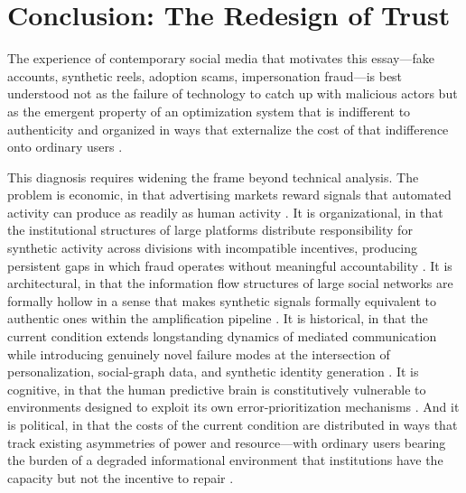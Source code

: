 \documentclass[12pt,a4paper]{article}
\begin{document}
\section{Conclusion: The Redesign of Trust}

The experience of contemporary social media that motivates this essay---fake accounts, synthetic
reels, adoption scams, impersonation fraud---is best understood not as the failure of technology
to catch up with malicious actors but as the emergent property of an optimization system that
is indifferent to authenticity and organized in ways that externalize the cost of that
indifference onto ordinary users \citep{zuboff2019,gillespie2018}.

This diagnosis requires widening the frame beyond technical analysis. The problem is economic,
in that advertising markets reward signals that automated activity can produce as readily as
human activity \citep{wu2016}. It is organizational, in that the institutional structures of
large platforms distribute responsibility for synthetic activity across divisions with incompatible
incentives, producing persistent gaps in which fraud operates without meaningful accountability
\citep{tufekci2015}. It is architectural, in that the information flow structures of large
social networks are formally hollow in a sense that makes synthetic signals formally equivalent
to authentic ones within the amplification pipeline \citep{gloy2025}. It is historical, in that
the current condition extends longstanding dynamics of mediated communication while introducing
genuinely novel failure modes at the intersection of personalization, social-graph data, and
synthetic identity generation \citep{debord1967,postman1985,vosoughi2018}. It is cognitive, in
that the human predictive brain is constitutively vulnerable to environments designed to exploit
its own error-prioritization mechanisms \citep{friston2010,panksepp1998}. And it is political,
in that the costs of the current condition are distributed in ways that track existing
asymmetries of power and resource---with ordinary users bearing the burden of a degraded
informational environment that institutions have the capacity but not the incentive to repair
\citep{noble2018,zuboff2019}.
\end{document}
